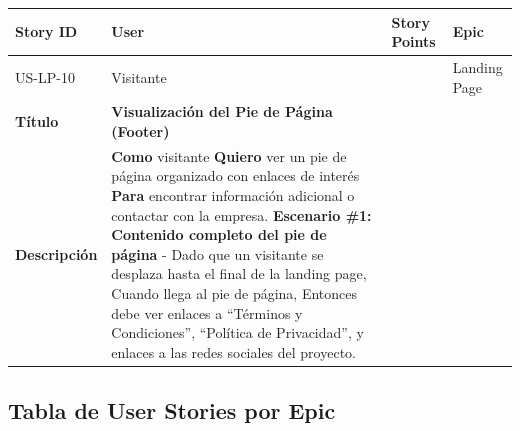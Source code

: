{\def\LTcaptype{none} %
\begin{longtable}[]{@{}
  >{\raggedright\arraybackslash}p{}
  >{\raggedright\arraybackslash}p{}
  >{\raggedright\arraybackslash}p{}
  >{\raggedright\arraybackslash}p{}@{}}
\toprule\noalign{}
\begin{minipage}[b]{\linewidth}\raggedright
Story ID
\end{minipage} & \begin{minipage}[b]{\linewidth}\raggedright
User
\end{minipage} & \begin{minipage}[b]{\linewidth}\raggedright
Story Points
\end{minipage} & \begin{minipage}[b]{\linewidth}\raggedright
Epic
\end{minipage} \\
\midrule\noalign{}
\endhead
\bottomrule\noalign{}
\endlastfoot
US-LP-10 & Visitante & 1 & Landing Page \\
\textbf{Título} & \textbf{Visualización del Pie de Página (Footer)} &
& \\
\textbf{Descripción} & \textbf{Como} visitante \textbf{Quiero} ver un
pie de página organizado con enlaces de interés \textbf{Para} encontrar
información adicional o contactar con la empresa. \textbf{Escenario \#1:
Contenido completo del pie de página} - Dado que un visitante se
desplaza hasta el final de la landing page, Cuando llega al pie de
página, Entonces debe ver enlaces a ``Términos y Condiciones'',
``Política de Privacidad'', y enlaces a las redes sociales del proyecto.
& & \\
\end{longtable}
}

\subsection{Tabla de User Stories por
Epic}\label{report__30-cap3-requirements-spec.md__tabla-de-user-stories-por-epic}

